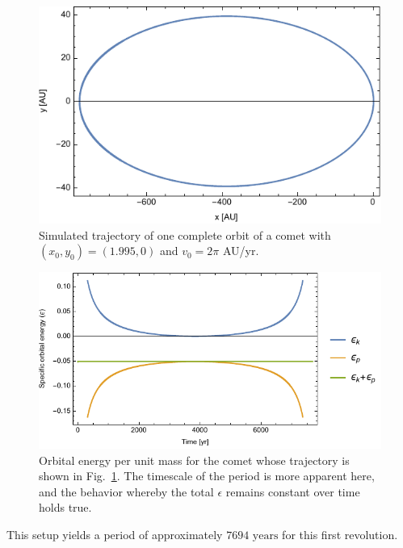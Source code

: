 \documentclass{article}
\begin{document}
\newpage
\bigskip
{}
\medskip

\begin{figure}[h!]
    \centering
    \includegraphics[width=5in]{homework3/q4orbit.pdf}
    \caption{Simulated trajectory of one complete orbit of a comet with $(x_0,y_0)=(1.995,0)$ and $v_0=2\pi$ AU/yr.}
    \label{fig:q4orbit}
\end{figure}

\begin{figure}[h!]
    \centering
    \includegraphics[width=5in]{homework3/q4energy.pdf}
    \caption{Orbital energy per unit mass for the comet whose trajectory is shown in Fig.~\ref{fig:q4orbit}. The timescale of the period is more apparent here, and the behavior whereby the total $\epsilon$ remains constant over time holds true.}
    \label{fig:q4energy}
\end{figure}

This setup yields a period of approximately $\boxed{7694\text{ years}}$ for this first revolution.

\newpage
\bigskip
{}
\medskip
\end{document}
